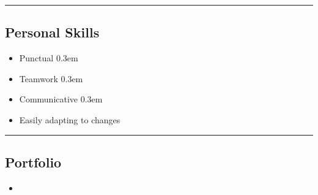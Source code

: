 \documentclass[10pt,letterpaper]{article}
\begin{document}
\hrule
\vspace{-1.0em}
\subsection*{Personal Skills}
  \begin{itemize}
  [label=\textbullet]
      \itemsep0.3em
      \item Punctual
      \itemsep0.3em
      \item Teamwork
      \itemsep0.3em
      \item Communicative
      \itemsep0.3em
      \item Easily adapting to changes
  \end{itemize}
\hrule 
\vspace{-1.0em} 
\subsection*{Portfolio} 
\begin{itemize} 
  \begin{itemize}
    \item  
  \end{itemize}
\end{itemize} 
\end{document}

